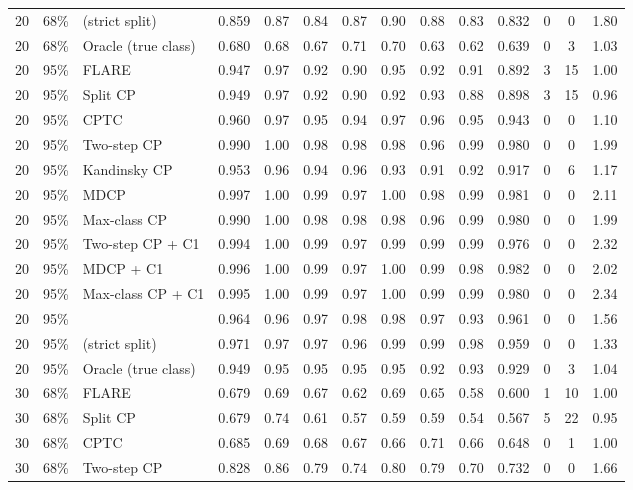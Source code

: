 \begin{longtable}{lllccccccccccc}
20 & 68\% & \gamut{} (strict split) & 0.859 & 0.87 & 0.84 & 0.87 & 0.90 & 0.88 & 0.83 & 0.832 & 0 & 0 & 1.80 \\
20 & 68\% & Oracle (true class) & 0.680 & 0.68 & 0.67 & 0.71 & 0.70 & 0.63 & 0.62 & 0.639 & 0 & 3 & 1.03 \\
\midrule
20 & 95\% & FLARE & 0.947 & 0.97 & 0.92 & 0.90 & 0.95 & 0.92 & 0.91 & 0.892 & 3 & 15 & 1.00 \\
20 & 95\% & Split CP & 0.949 & 0.97 & 0.92 & 0.90 & 0.92 & 0.93 & 0.88 & 0.898 & 3 & 15 & 0.96 \\
20 & 95\% & CPTC & 0.960 & 0.97 & 0.95 & 0.94 & 0.97 & 0.96 & 0.95 & 0.943 & 0 & 0 & 1.10 \\
20 & 95\% & Two-step CP & 0.990 & 1.00 & 0.98 & 0.98 & 0.98 & 0.96 & 0.99 & 0.980 & 0 & 0 & 1.99 \\
20 & 95\% & Kandinsky CP & 0.953 & 0.96 & 0.94 & 0.96 & 0.93 & 0.91 & 0.92 & 0.917 & 0 & 6 & 1.17 \\
20 & 95\% & MDCP & 0.997 & 1.00 & 0.99 & 0.97 & 1.00 & 0.98 & 0.99 & 0.981 & 0 & 0 & 2.11 \\
20 & 95\% & Max-class CP & 0.990 & 1.00 & 0.98 & 0.98 & 0.98 & 0.96 & 0.99 & 0.980 & 0 & 0 & 1.99 \\
20 & 95\% & Two-step CP + C1 & 0.994 & 1.00 & 0.99 & 0.97 & 0.99 & 0.99 & 0.99 & 0.976 & 0 & 0 & 2.32 \\
20 & 95\% & MDCP + C1 & 0.996 & 1.00 & 0.99 & 0.97 & 1.00 & 0.99 & 0.98 & 0.982 & 0 & 0 & 2.02 \\
20 & 95\% & Max-class CP + C1 & 0.995 & 1.00 & 0.99 & 0.97 & 1.00 & 0.99 & 0.99 & 0.980 & 0 & 0 & 2.34 \\
20 & 95\% & \gamut{} & 0.964 & 0.96 & 0.97 & 0.98 & 0.98 & 0.97 & 0.93 & 0.961 & 0 & 0 & 1.56 \\
20 & 95\% & \gamut{} (strict split) & 0.971 & 0.97 & 0.97 & 0.96 & 0.99 & 0.99 & 0.98 & 0.959 & 0 & 0 & 1.33 \\
20 & 95\% & Oracle (true class) & 0.949 & 0.95 & 0.95 & 0.95 & 0.95 & 0.92 & 0.93 & 0.929 & 0 & 3 & 1.04 \\
\midrule
30 & 68\% & FLARE & 0.679 & 0.69 & 0.67 & 0.62 & 0.69 & 0.65 & 0.58 & 0.600 & 1 & 10 & 1.00 \\
30 & 68\% & Split CP & 0.679 & 0.74 & 0.61 & 0.57 & 0.59 & 0.59 & 0.54 & 0.567 & 5 & 22 & 0.95 \\
30 & 68\% & CPTC & 0.685 & 0.69 & 0.68 & 0.67 & 0.66 & 0.71 & 0.66 & 0.648 & 0 & 1 & 1.00 \\
30 & 68\% & Two-step CP & 0.828 & 0.86 & 0.79 & 0.74 & 0.80 & 0.79 & 0.70 & 0.732 & 0 & 0 & 1.66 \\

\end{longtable}
